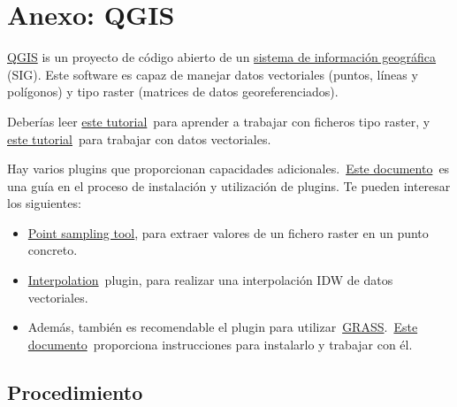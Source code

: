 \documentclass[11pt]{article}
\begin{document}
\section{Anexo: QGIS}
\label{sec:qgis}

\href{https://qgis.org/es/site/}{QGIS} is un proyecto de código
abierto de un
\href{https://es.wikipedia.org/wiki/Sistema\_de\_informaci\%C3\%B3n\_geogr\%C3\%A1fica}{sistema
  de información geográfica} (SIG). Este software es capaz de manejar
datos vectoriales (puntos, líneas y polígonos) y tipo raster (matrices
de datos georeferenciados).

Deberías leer
\href{https://docs.qgis.org/3.28/es/docs/user_manual/working_with_raster/index.html}{este
  tutorial} para aprender a trabajar con ficheros tipo raster, y
\href{http://docs.qgis.org/3.28/es/docs/user\_manual/working\_with\_vector/index.html}{este
  tutorial} para trabajar con datos vectoriales.

Hay varios plugins que proporcionan capacidades
adicionales. \href{https://docs.qgis.org/3.28/es/docs/training\_manual/qgis\_plugins/fetching\_plugins.html}{Este
  documento} es una guía en el proceso de instalación y utilización de
plugins. Te pueden interesar los siguientes:

\begin{itemize}
\item \href{https://plugins.qgis.org/plugins/pointsamplingtool/}{Point
    sampling tool}, para extraer valores de un fichero raster en un
  punto concreto.
\item
  \href{https://docs.qgis.org/3.28/es/docs/user\_manual/plugins/plugins\_interpolation.html}{Interpolation} plugin,
  para realizar una interpolación IDW de datos vectoriales.
\item Además, también es recomendable el plugin para
  utilizar \href{https://grass.osgeo.org/}{GRASS}. \href{http://docs.qgis.org/3.28/es/docs/user\_manual/grass\_integration/grass\_integration.html}{Este
    documento} proporciona instrucciones para instalarlo y trabajar
  con él.
\end{itemize}

\subsection*{Procedimiento}
\label{sec:orge72c353}
\end{document}
